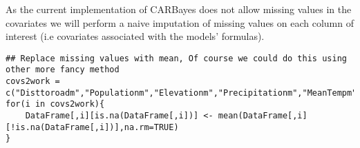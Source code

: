 \documentclass[11pt]{article}
\begin{document}
As the current implementation of CARBayes does not allow missing values in the covariates we will perform a naive imputation of missing values on each column of interest (i.e covariates associated with the models' formulas).

\begin{verbatim}
## Replace missing values with mean, Of course we could do this using other more fancy method
covs2work = c("Disttoroadm","Populationm","Elevationm","Precipitationm","MeanTempm")
for(i in covs2work){
    DataFrame[,i][is.na(DataFrame[,i])] <- mean(DataFrame[,i][!is.na(DataFrame[,i])],na.rm=TRUE)
}
\end{verbatim}





\end{document}
